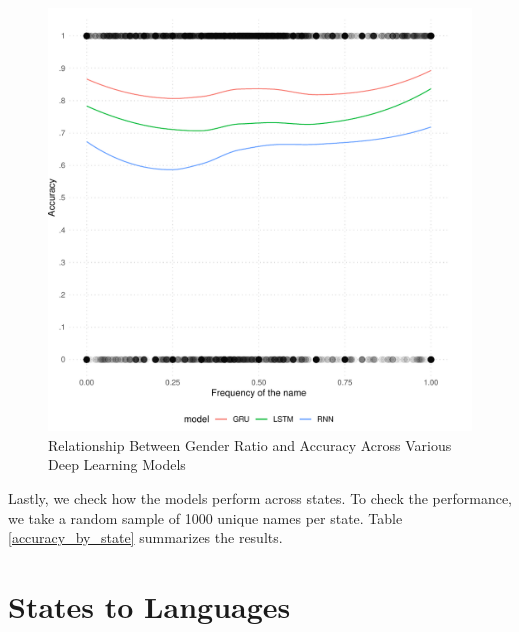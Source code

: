 \documentclass[11pt,  letterpaper]{article}
\begin{document}
\begin{figure}[!htb]

  \centering

    \caption{Relationship Between Gender Ratio and Accuracy Across Various Deep Learning Models}

  \includegraphics[]{figs/gender_perf.pdf}

  \label{fig:women_accuracy}

\end{figure}

Lastly, we check how the models perform across states. To check the performance, we take a random sample of 1000 unique names per state. Table \ref{accuracy_by_state} summarizes the results. 



 

\section{States to Languages}
\end{document}
